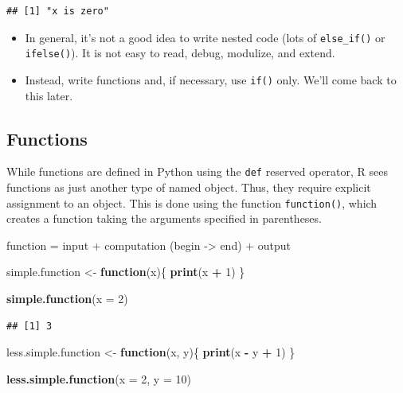 \documentclass[
]{book}
\newenvironment{Shaded}{\begin{snugshade}}{\end{snugshade}}
\newcommand{\AttributeTok}[1]{\textcolor[rgb]{0.13,0.29,0.53}{#1}}
\newcommand{\ControlFlowTok}[1]{\textcolor[rgb]{0.13,0.29,0.53}{\textbf{#1}}}
\newcommand{\DecValTok}[1]{\textcolor[rgb]{0.00,0.00,0.81}{#1}}
\newcommand{\FunctionTok}[1]{\textcolor[rgb]{0.13,0.29,0.53}{\textbf{#1}}}
\newcommand{\NormalTok}[1]{#1}
\newcommand{\OtherTok}[1]{\textcolor[rgb]{0.56,0.35,0.01}{#1}}
\newcommand{\SpecialCharTok}[1]{\textcolor[rgb]{0.81,0.36,0.00}{\textbf{#1}}}
\providecommand{\tightlist}{%
  \setlength{\itemsep}{0pt}\setlength{\parskip}{0pt}}
\begin{document}
\begin{verbatim}
## [1] "x is zero"
\end{verbatim}

\begin{itemize}
\tightlist
\item
  In general, it's not a good idea to write nested code (lots of \texttt{else\_if()} or \texttt{ifelse()}). It is not easy to read, debug, modulize, and extend.
\item
  Instead, write functions and, if necessary, use \texttt{if()} only. We'll come back to this later.
\end{itemize}

\subsection{Functions}\label{functions}

While functions are defined in Python using the \texttt{def} reserved operator, R sees functions as just another type of named object. Thus, they require explicit assignment to an object. This is done using the function \texttt{function()}, which creates a function taking the arguments specified in parentheses.

function = input + computation (begin -\textgreater{} end) + output

\begin{Shaded}
\begin{Highlighting}[]
\NormalTok{simple.function }\OtherTok{\textless{}{-}} \ControlFlowTok{function}\NormalTok{(x)\{}
  \FunctionTok{print}\NormalTok{(x }\SpecialCharTok{+} \DecValTok{1}\NormalTok{)}
\NormalTok{\}}

\FunctionTok{simple.function}\NormalTok{(}\AttributeTok{x =} \DecValTok{2}\NormalTok{)}
\end{Highlighting}
\end{Shaded}

\begin{verbatim}
## [1] 3
\end{verbatim}

\begin{Shaded}
\begin{Highlighting}[]
\NormalTok{less.simple.function }\OtherTok{\textless{}{-}} \ControlFlowTok{function}\NormalTok{(x, y)\{}
  \FunctionTok{print}\NormalTok{(x }\SpecialCharTok{{-}}\NormalTok{ y }\SpecialCharTok{+} \DecValTok{1}\NormalTok{)}
\NormalTok{\}}

\FunctionTok{less.simple.function}\NormalTok{(}\AttributeTok{x =} \DecValTok{2}\NormalTok{, }\AttributeTok{y =} \DecValTok{10}\NormalTok{)}
\end{Highlighting}
\end{Shaded}
\end{document}
